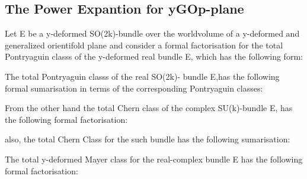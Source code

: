 \documentclass[a4paper,a4paper]{article}
\begin{document}
\begin{center}
{  \coordHE{}}
\end{center} 
\begin{center}
{  \coordHE{}}
\end{center}

\subsection{The Power Expantion for yGOp-plane }
Let E be a y-deformed  SO(2k)-bundle over the worldvolume of a y-deformed and generalized orientifold plane and consider a formal factorisation for the total Pontryaguin classs of the y-deformed real bundle E, which has the following form:

\begin{center}
{  \coordHE{} }
\end{center}
The total Pontryaguin classs of the real SO(2k)- bundle E,has the following formal sumarisation in terms of the corresponding Pontryaguin classes: 
\begin{center}
{  \coordHE{} }
\end{center}
From the other hand the total Chern class of the complex SU(k)-bundle E, has the following formal factorisation:
\begin{center}
{  \coordHE{} }
\end{center}
also, the total Chern Class for the such bundle has the following sumarisation:
\begin{center}
{  \coordHE{} }
\end{center} 
The total  y-deformed Mayer class for the real-complex bundle E has the following formal factorisation:

\begin{center}
{  \coordHE{} }
\end{center}
\end{document}
